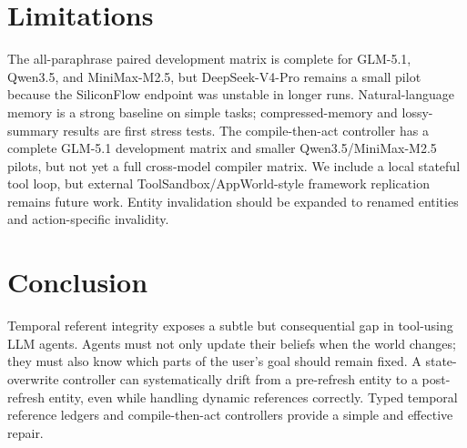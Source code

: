 \documentclass[11pt]{article}
\begin{document}
\section{Limitations}

The all-paraphrase paired development matrix is complete for GLM-5.1, Qwen3.5, and MiniMax-M2.5, but DeepSeek-V4-Pro remains a small pilot because the SiliconFlow endpoint was unstable in longer runs. Natural-language memory is a strong baseline on simple tasks; compressed-memory and lossy-summary results are first stress tests. The compile-then-act controller has a complete GLM-5.1 development matrix and smaller Qwen3.5/MiniMax-M2.5 pilots, but not yet a full cross-model compiler matrix. We include a local stateful tool loop, but external ToolSandbox/AppWorld-style framework replication remains future work. Entity invalidation should be expanded to renamed entities and action-specific invalidity.

\section{Conclusion}

Temporal referent integrity exposes a subtle but consequential gap in tool-using LLM agents. Agents must not only update their beliefs when the world changes; they must also know which parts of the user's goal should remain fixed. A state-overwrite controller can systematically drift from a pre-refresh entity to a post-refresh entity, even while handling dynamic references correctly. Typed temporal reference ledgers and compile-then-act controllers provide a simple and effective repair.
\end{document}
